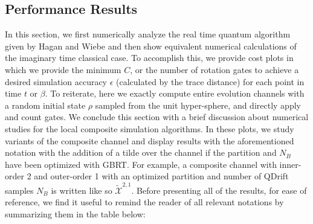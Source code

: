 \subsection{Performance Results} \label{subsec:performance}
In this section, we first numerically analyze the real time quantum algorithm given by Hagan and Wiebe \cite{hagan2022composite} and then show equivalent numerical calculations of the imaginary time classical case. To accomplish this, we provide cost plots in which we provide the minimum $C$, or the number of rotation gates to achieve a desired simulation accuracy $\epsilon$ (calculated by the trace distance) for each point in time $t$ or $\beta$. To reiterate, here we exactly compute entire evolution channels with a random initial state $\rho$ sampled from the unit hyper-sphere, and directly apply and count gates. We conclude this section with a brief discussion about numerical studies for the local composite simulation algorithms. In these plots, we study variants of the composite channel and display results with the aforementioned notation with the addition of a tilde over the channel if the partition and $N_B$ have been optimized with GBRT. 
For example, a composite channel with inner-order 2 and outer-order 1 with an optimized partition and number of QDrift samples $N_B$ is written like so $\widetilde{\mathcal{X}}^{2,1}$. Before presenting all of the results, for ease of reference, we find it useful to remind the reader of all relevant notations by summarizing them in the table below:\\

